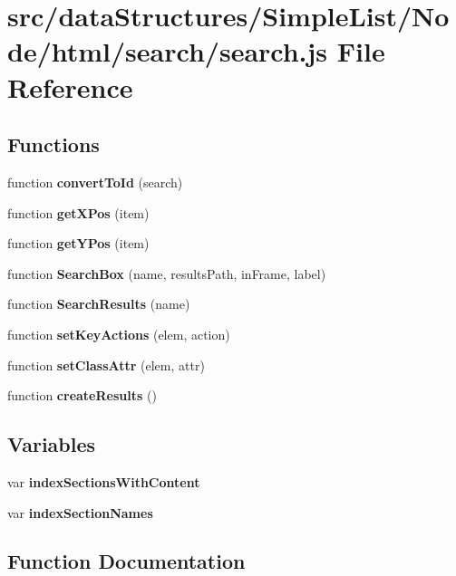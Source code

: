 \section{src/data\-Structures/\-Simple\-List/\-Node/html/search/search.js File Reference}
\label{data_structures_2_simple_list_2_node_2html_2search_2search_8js}
\subsection*{Functions}
\begin{DoxyCompactItemize}
\item 
function {\bf convert\-To\-Id} (search)
\item 
function {\bf get\-X\-Pos} (item)
\item 
function {\bf get\-Y\-Pos} (item)
\item 
function {\bf Search\-Box} (name, results\-Path, in\-Frame, label)
\item 
function {\bf Search\-Results} (name)
\item 
function {\bf set\-Key\-Actions} (elem, action)
\item 
function {\bf set\-Class\-Attr} (elem, attr)
\item 
function {\bf create\-Results} ()
\end{DoxyCompactItemize}
\subsection*{Variables}
\begin{DoxyCompactItemize}
\item 
var {\bf index\-Sections\-With\-Content}
\item 
var {\bf index\-Section\-Names}
\end{DoxyCompactItemize}


\subsection{Function Documentation}
